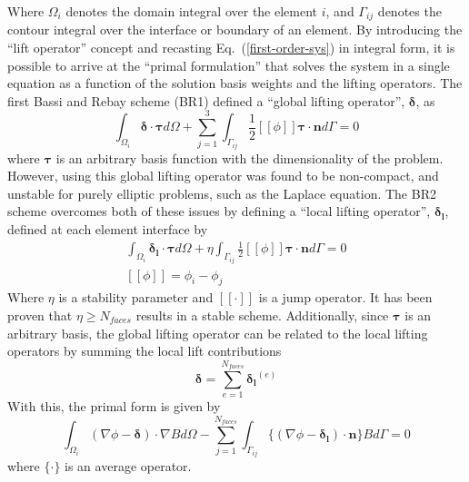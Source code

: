 \documentclass[a4paper]{article}
\newcommand{\eref}[1]{Eq.~(\ref{#1})}
\newcommand{\dint}[1]{\int_{\Omega_i}{#1 d\Omega}}
\newcommand{\sint}[1]{\int_{\Gamma_{ij}}{#1 d\Gamma}}
\newcommand{\average}[1]{\ensuremath{\{#1\}} }
\newcommand{\jump}[1]{\ensuremath{[\![#1]\!]} }
\newcommand{\vbasis}{\boldsymbol{\tau}}
\newcommand{\glift}{\boldsymbol{\delta}}
\newcommand{\llift}{\boldsymbol{\delta_l}}
\newcommand{\unitn}{\mathbf{n}}
\begin{document}
Where $\Omega_i$ denotes the domain integral over the element $i$, and
$\Gamma_{ij}$ denotes the contour integral over the interface or boundary of an
element.
By introducing the ``lift operator'' concept and recasting
\eref{first-order-sys} in integral form, it is possible to arrive at the
``primal formulation'' that solves the system in a single equation as a function
of the solution basis weights and the lifting operators.  The first Bassi and
Rebay scheme\cite{BR1} (BR1) defined a ``global lifting operator'', $\glift$, as
\begin{equation}
  \dint{\glift \cdot \vbasis} + \sum_{j=1}^3\sint{\frac{1}{2} \jump{\phi}
  \vbasis \cdot \unitn} = 0
  \label{global-lift-def}
\end{equation}
where $\vbasis$ is an arbitrary basis function with the dimensionality of the
problem. However, using this global lifting operator was found to be
non-compact, and unstable for purely elliptic problems, such as the Laplace
equation. The BR2 scheme overcomes both of these issues by defining a ``local
lifting operator'', $\llift$, defined at each element interface by
\begin{equation}
  \begin{gathered}
    \dint{\llift \cdot \vbasis} + \eta\sint{\frac{1}{2} \jump{\phi} \vbasis
    \cdot \unitn} = 0 \\
    \jump{\phi} = \phi_i - \phi_j
  \end{gathered}
  \label{local-lift-def}
\end{equation}
Where $\eta$ is a stability parameter and $\jump{\cdot}$ is a jump operator.  It
has been proven\cite{hartmann} that $\eta \geq N_{faces}$ results in a stable scheme.
Additionally, since $\vbasis$ is an arbitrary basis, the global lifting operator
can be related to the local lifting operators by summing the local lift
contributions
\begin{equation}
  \glift = \sum_{e=1}^{N_{faces}}{\llift^{(e)}}
  \label{local-global-relation}
\end{equation}
With this, the primal form is given by
\begin{equation}
  \dint{(\nabla \phi - \glift)\cdot \nabla B} -
  \sum_{j=1}^{N_{faces}}\sint{\average{(\nabla \phi - \llift)\cdot\unitn}B} = 0
  \label{primal-form}
\end{equation}
where $\average{\cdot}$ is an average operator.
\end{document}
